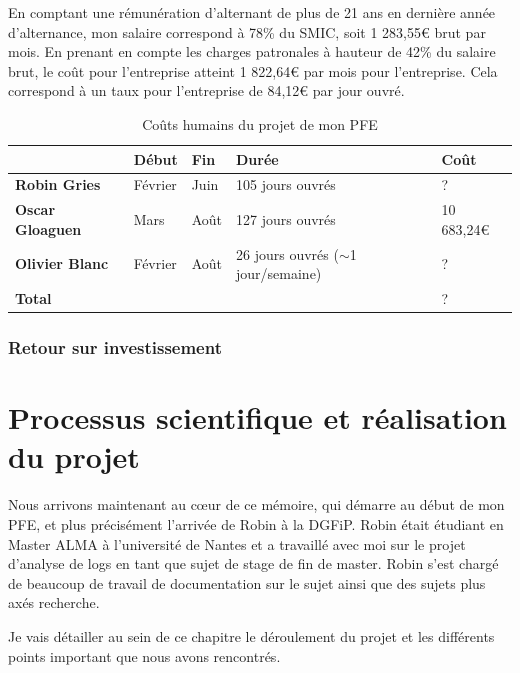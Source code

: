\documentclass[openany, 11pt]{memoir}
\begin{document}
En comptant une rémunération d'alternant de plus de 21 ans en dernière année d'alternance, mon salaire correspond à 78\% du SMIC, soit 1 283,55€ brut par mois. En prenant en compte les charges patronales à hauteur de 42\% du salaire brut, le coût pour l'entreprise atteint 1 822,64€ par mois pour l'entreprise.  Cela correspond à un taux pour l'entreprise de 84,12€ par jour ouvré.

\begin{table}[ht]
	\centering
	\begin{tabular}{|l|l|l|l|l|}
		\hline
		& \textbf{Début} & \textbf{Fin} & \textbf{Durée} & \textbf{Coût} \\
		\hline
		\textbf{Robin Gries} & Février & Juin & 105 jours ouvrés & ? \\
		\hline
		\textbf{Oscar Gloaguen} & Mars & Août & 127 jours ouvrés & 10 683,24€ \\
		\hline
		\textbf{Olivier Blanc} & Février & Août & \makecell[l]{26 jours ouvrés \\ ($\sim$1 jour/semaine)} & ? \\
		\hline \hline
		\multicolumn{4}{|l|}{\textbf{Total}} & ? \\
		\hline
	\end{tabular}
	\caption{Coûts humains du projet de mon PFE}
	\label{couts}
\end{table}


\subsection{Retour sur investissement}


\newpage
\chapter{Processus scientifique et réalisation du projet}

Nous arrivons maintenant au cœur de ce mémoire, qui démarre au début de mon PFE, et plus précisément l'arrivée de Robin à la \gls{DGFiP}. Robin était étudiant en Master ALMA à l'université de Nantes et a travaillé avec moi sur le projet d'analyse de \glspl{log} en tant que sujet de stage de fin de master. Robin s'est chargé de beaucoup de travail de documentation sur le sujet ainsi que des sujets plus axés recherche.

Je vais détailler au sein de ce chapitre le déroulement du projet et les différents points important que nous avons rencontrés.
\end{document}
